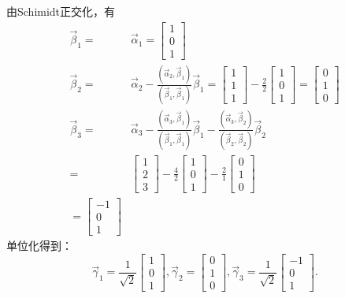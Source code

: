 \documentclass[a4paper]{book}
\begin{document}
由Schimidt正交化，有\\
\begin{align*}
\vec{\beta}_1=&\vec{\alpha}_1=\begin{bmatrix}1\\0\\1\end{bmatrix}\\
\vec{\beta}_2=&\vec{\alpha}_2-\frac{(\vec{\alpha}_2,\vec{\beta}_1)}{(\vec{\beta}_1,\vec{\beta}_1)}\vec{\beta}_1
             =\begin{bmatrix}1\\1\\1\end{bmatrix}-\frac{2}{2}\begin{bmatrix}1\\0\\1\end{bmatrix}
             =\begin{bmatrix}0\\1\\0\end{bmatrix}\\
\vec{\beta}_3=&\vec{\alpha}_3-\frac{(\vec{\alpha}_3,\vec{\beta}_1)}{(\vec{\beta}_1,\vec{\beta}_1)}\vec{\beta}_1-
              \frac{(\vec{\alpha}_3,\vec{\beta}_2)}{(\vec{\beta}_2,\vec{\beta}_2)}\vec{\beta}_2\\
             =&\begin{bmatrix}1\\2\\3\end{bmatrix}-\frac{4}{2}\begin{bmatrix}1\\0\\1\end{bmatrix}-
               \frac{2}{1}\begin{bmatrix}0\\1\\0\end{bmatrix}\\
             =\begin{bmatrix}-1\\0\\1\end{bmatrix}
\end{align*}
单位化得到：
\begin{equation*}
\vec{\gamma}_1=\frac{1}{\sqrt{2}}\begin{bmatrix}1\\0\\1\end{bmatrix},
\vec{\gamma}_2=\begin{bmatrix}0\\1\\0\end{bmatrix},
\vec{\gamma}_3=\frac{1}{\sqrt{2}}\begin{bmatrix}-1\\0\\1\end{bmatrix}.
\end{equation*}
\end{document}
